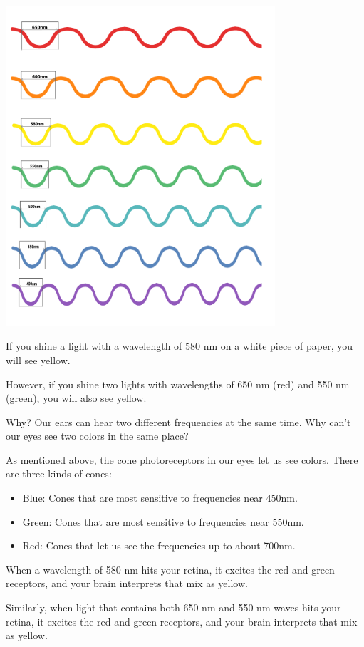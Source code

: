 \includegraphics[width=0.75\textwidth]{Color_Waves.png}

If you shine a light with a wavelength of 580 nm on a white piece of
paper, you will see yellow.

However, if you shine two lights with wavelengths of 650 nm (red) and
550 nm (green), you will also see yellow.

Why? Our ears can hear two different frequencies at the same time.
Why can't our eyes see two colors in the same place?

As mentioned above, the cone photoreceptors in our eyes let us see
colors. There are three kinds of cones:
\begin{itemize}
  \item Blue: Cones that are most sensitive to frequencies near 450nm.
  \item Green: Cones that are most sensitive to frequencies near 550nm.
  \item Red: Cones that let us see the frequencies up to about 700nm.
\end{itemize}

When a wavelength of 580 nm hits your retina, it excites the red
and green receptors, and your brain interprets that mix as yellow.

Similarly, when light that contains both 650 nm and 550 nm waves hits
your retina, it excites the red and green receptors, and your brain
interprets that mix as yellow.

